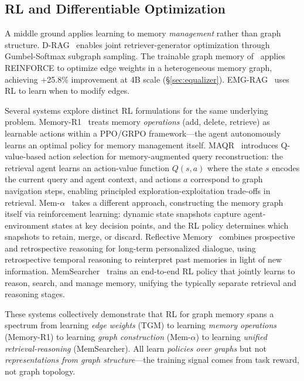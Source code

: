 \documentclass[hf]{ceurart}
\begin{document}
\subsection{RL and Differentiable Optimization}

A middle ground applies learning to memory \emph{management} rather
than graph structure. D-RAG~\cite{drag2025} enables joint
retriever-generator optimization through Gumbel-Softmax subgraph
sampling. The trainable graph memory of~\cite{trainablegraph2025}
applies REINFORCE to optimize edge weights in a heterogeneous memory
graph, achieving +25.8\% improvement at 4B scale
(\S\ref{sec:equalizer}). EMG-RAG~\cite{emgrag2024} uses RL to learn
when to modify edges.

Several systems explore distinct RL formulations for the same
underlying problem. Memory-R1~\cite{memoryr12025} treats memory
\emph{operations} (add, delete, retrieve) as learnable actions within
a PPO/GRPO framework---the agent autonomously learns an optimal policy
for memory management itself. MAQR~\cite{maqr2025} introduces
Q-value-based action selection for memory-augmented query
reconstruction: the retrieval agent learns an action-value function
$Q(s, a)$ where the state $s$ encodes the current query and agent
context, and actions $a$ correspond to graph navigation steps, enabling
principled exploration-exploitation trade-offs in retrieval.
Mem-$\alpha$~\cite{memalpha2025} takes a different approach,
constructing the memory graph itself via reinforcement learning:
dynamic state snapshots capture agent-environment states at key
decision points, and the RL policy determines which snapshots to
retain, merge, or discard. Reflective Memory~\cite{reflectivemem2025}
combines prospective and retrospective reasoning for long-term
personalized dialogue, using retrospective temporal reasoning to
reinterpret past memories in light of new information.
MemSearcher~\cite{memsearcher2025} trains an end-to-end RL policy that
jointly learns to reason, search, and manage memory, unifying the
typically separate retrieval and reasoning stages.

These systems collectively demonstrate that RL for graph memory spans
a spectrum from learning \emph{edge weights} (TGM) to learning
\emph{memory operations} (Memory-R1) to learning \emph{graph
construction} (Mem-$\alpha$) to learning \emph{unified
retrieval-reasoning} (MemSearcher). All learn \emph{policies over
graphs} but not \emph{representations from graph structure}---the
training signal comes from task reward, not graph topology.
\end{document}
